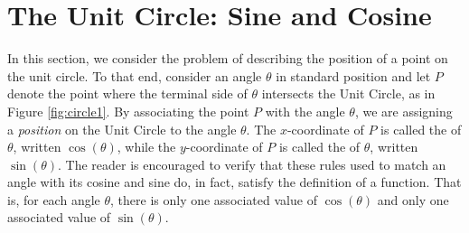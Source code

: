 \section{The Unit Circle: Sine and Cosine}

\label{TheUnitCircle}

In this section, we consider the problem of describing the position of a point on the unit circle.  To that end, consider an angle $\theta$ in standard position and let $P$ denote the point where the terminal side of $\theta$ intersects the Unit Circle, as in Figure \ref{fig:circle1}.  By associating the point $P$ with the angle $\theta$, we are assigning a \emph{position} on the Unit Circle to the angle $\theta$.  The $x$-coordinate of $P$ is called the   of $\theta$, written $\cos(\theta)$, while the $y$-coordinate of $P$ is called the   of $\theta$, written $\sin(\theta)$.  The reader is encouraged to verify that these rules used to match an angle with its cosine and sine do, in fact, satisfy the definition of a function.  That is, for each angle $\theta$, there is only one associated value of $\cos(\theta)$ and only one associated value of $\sin(\theta)$.  




\medskip

